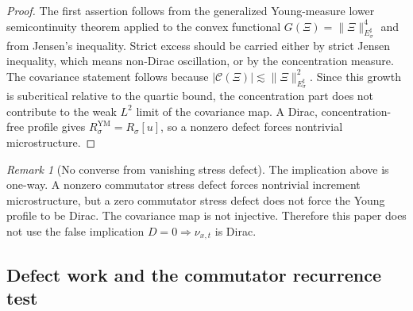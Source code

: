 \documentclass[11pt]{article}
\numberwithin{equation}{section}
\theoremstyle{plain}
\theoremstyle{definition}
\theoremstyle{remark}
\newtheorem{remark}[theorem]{Remark}
\begin{document}
\begin{proof}
The first assertion follows from the generalized Young-measure lower semicontinuity theorem applied to the convex functional $G(\Xi)=\|\Xi\|_{E^\sharp_\sigma}^{4}$ and from Jensen's inequality.  Strict excess should be carried either by strict Jensen inequality, which means non-Dirac oscillation, or by the concentration measure.  The covariance statement follows because $|\mathcal C(\Xi)|\lesssim \|\Xi\|_{E^\sharp_\sigma}^2$.  Since this growth is subcritical relative to the quartic bound, the concentration part does not contribute to the weak $L^2$ limit of the covariance map.  A Dirac, concentration-free profile gives $R^{\mathrm{YM}}_\sigma=R_\sigma[u]$, so a nonzero defect forces nontrivial microstructure.
\end{proof}

\begin{remark}[No converse from vanishing stress defect]\label{rem:no-converse-stress-defect}
The implication above is one-way.  A nonzero commutator stress defect forces nontrivial increment microstructure, but a zero commutator stress defect does not force the Young profile to be Dirac.  The covariance map is not injective.  Therefore this paper does not use the false implication $D=0\Rightarrow\nu_{x,t}$ is Dirac.
\end{remark}

\subsection{Defect work and the commutator recurrence test}
\end{document}

